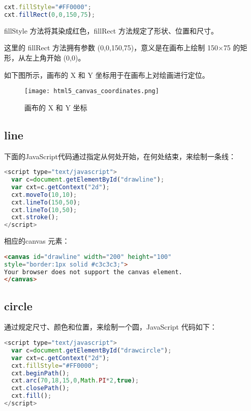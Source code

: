 \begin{lstlisting}[language=JavaScript]
cxt.fillStyle="#FF0000";
cxt.fillRect(0,0,150,75); 
\end{lstlisting}

fillStyle 方法将其染成红色，fillRect 方法规定了形状、位置和尺寸。

这里的 fillRect 方法拥有参数 (0,0,150,75)，意义是在画布上绘制 150$\times$75 的矩形，从左上角开始 (0,0)。

如下图所示，画布的 X 和 Y 坐标用于在画布上对绘画进行定位。

\begin{figure}[!h]
\centering
\texttt{[image: html5\_canvas\_coordinates.png]}
\caption{画布的 X 和 Y 坐标}
\label{html5_canvas_coordinates}
\end{figure}

\subsection{line}


下面的JavaScript代码通过指定从何处开始，在何处结束，来绘制一条线：


\begin{lstlisting}[language=JavaScript]
<script type="text/javascript">
  var c=document.getElementById("drawline");
  var cxt=c.getContext("2d");
  cxt.moveTo(10,10);
  cxt.lineTo(150,50);
  cxt.lineTo(10,50);
  cxt.stroke();
</script>
\end{lstlisting}

相应的canvas 元素：

\begin{lstlisting}[language=HTML]
<canvas id="drawline" width="200" height="100" 
style="border:1px solid #c3c3c3;">
Your browser does not support the canvas element.
</canvas>
\end{lstlisting}




\subsection{circle}


通过规定尺寸、颜色和位置，来绘制一个圆，JavaScript 代码如下：


\begin{lstlisting}[language=JavaScript]
<script type="text/javascript">
  var c=document.getElementById("drawcircle");
  var cxt=c.getContext("2d");
  cxt.fillStyle="#FF0000";
  cxt.beginPath();
  cxt.arc(70,18,15,0,Math.PI*2,true);
  cxt.closePath();
  cxt.fill();
</script>
\end{lstlisting}


